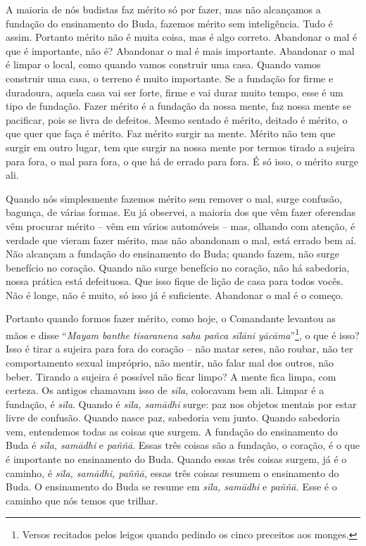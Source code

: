 A maioria de nós budistas faz mérito só por fazer, mas não
alcançamos a fundação do ensinamento do Buda, fazemos mérito sem
inteligência. Tudo é assim. Portanto mérito não é muita coisa, mas é
algo correto. Abandonar o mal é que é importante, não é? Abandonar o
mal é mais importante. Abandonar o mal é limpar o local, como quando
vamos construir uma casa. Quando vamos construir uma casa, o terreno é
muito importante. Se a fundação for firme e duradoura, aquela casa vai
ser forte, firme e vai durar muito tempo, esse é um tipo de fundação.
Fazer mérito é a fundação da nossa mente, faz nossa mente se pacificar,
pois se livra de defeitos. Mesmo sentado é mérito, deitado é mérito, o
que quer que faça é mérito. Faz mérito surgir na mente. Mérito não tem
que surgir em outro lugar, tem que surgir na nossa mente por termos
tirado a sujeira para fora, o mal para fora, o que há de errado para
fora. É só isso, o mérito surge ali. 

Quando nós simplesmente fazemos mérito sem remover o mal, surge
confusão, bagunça, de várias formas. Eu já observei, a maioria dos que
vêm fazer oferendas vêm procurar mérito – vêm em vários automóveis –
mas, olhando com atenção, é verdade que vieram fazer mérito, mas não
abandonam o mal, está errado bem aí. Não alcançam a fundação do
ensinamento do Buda; quando fazem, não surge benefício no coração.
Quando não surge benefício no coração, não há sabedoria, nossa prática
está defeituosa. Que isso fique de lição de casa para todos vocês. Não
é longe, não é muito, só isso já é suficiente. Abandonar o mal é o
começo.

Portanto quando formos fazer mérito, como hoje, o Comandante
levantou as mãos e disse “\textit{Mayam banthe tisaranena saha pañca
sīlāni yācāma}”\footnote{Versos recitados pelos leigos quando
pedindo os cinco preceitos aos monges. }, o que é isso? Isso é tirar a
sujeira para fora do coração – não matar seres, não
roubar, não ter comportamento sexual impróprio, não mentir, não falar
mal dos outros, não beber. Tirando a sujeira é possível não ficar
limpo? A mente fica limpa, com certeza. Os antigos chamavam isso de
\textit{sīla}, colocavam bem ali. Limpar é a fundação, é
\textit{sīla}. Quando é \textit{sīla, samādhi} surge: paz nos
objetos mentais por estar livre de confusão. Quando nasce paz,
sabedoria vem junto. Quando sabedoria vem, entendemos todas as coisas
que surgem. A fundação do ensinamento do Buda é \textit{sīla,
samādhi }e\textit{ paññā}. Essas três coisas são a fundação, o
coração, é o que é importante no ensinamento do Buda. Quando essas três
coisas surgem, já é o caminho, é \textit{sīla, samādhi, paññā,}
essas três coisas resumem o ensinamento do Buda. O ensinamento do Buda
se resume em \textit{sīla, samādhi }e\textit{ paññā.} Esse é o
caminho que nós temos que trilhar. 

